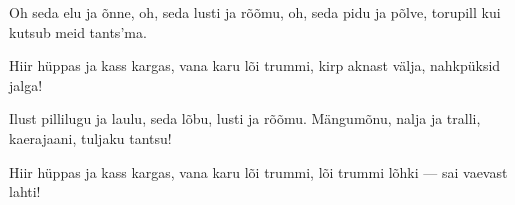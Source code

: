Oh seda elu ja \~onne,
oh, seda lusti ja r\~o\~omu,
oh, seda pidu ja p\~olve,
torupill kui kutsub meid tants'ma.

Hiir h\"uppas ja kass kargas,
vana karu l\~oi trummi,
kirp aknast v\"alja,
nahkp\"uksid jalga!

Ilust pillilugu ja laulu,
seda l\~obu, lusti ja r\~o\~omu.
M\"angum\~onu, nalja ja tralli,
kaerajaani, tuljaku tantsu!

Hiir h\"uppas ja kass kargas,
vana karu l\~oi trummi,
l\~oi trummi l\~ohki ---
sai vaevast lahti!